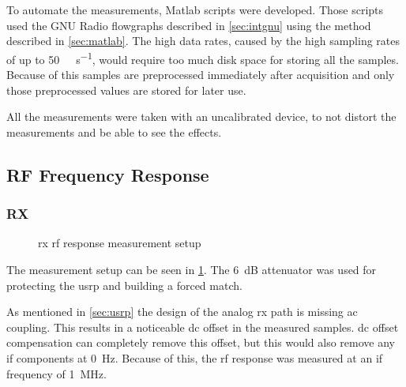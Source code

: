 \documentclass[12pt,a4paper,parskip=full,abstracton]{scrartcl}
\begin{document}
To automate the measurements, Matlab scripts were developed. Those scripts used the GNU Radio
flowgraphs described in \cref{sec:intgnu} using the method described in \cref{sec:matlab}. The high
data rates, caused by the high sampling rates of up to \SI{50}{\mega\samples\per\second}, would
require too much disk space for storing all the samples. Because of this samples are preprocessed
immediately after acquisition and only those preprocessed values are stored for later use.

All the measurements were taken with an uncalibrated device, to not distort the measurements
and be able to see the effects.

\subsection{RF Frequency Response}
\subsubsection{RX}
\label{sec:rfrx}
\begin{figure}[htb]
    \centering
    \caption{\gls{rx} \gls{rf} response measurement setup}
    \label{fig:rxrfsetup}
\end{figure}

The measurement setup can be seen in \cref{fig:rxrfsetup}. The \SI{6}{\deci\bel}
attenuator was used for protecting the \gls{usrp} and building a forced match.

As mentioned in \cref{sec:usrp} the design of the analog \gls{rx} path is missing \gls{ac}
coupling. This results in a noticeable \gls{dc} offset in the measured samples.
\gls{dc} offset compensation can completely remove this offset, but this would
also remove any \gls{if} components at \SI{0}{\hertz}. Because of this, the
\gls{rf} response was measured at an \gls{if} frequency of
\SI{1}{\mega\hertz}.
\end{document}
